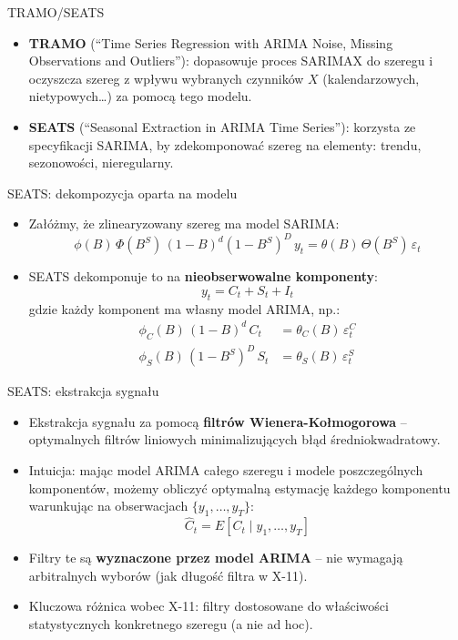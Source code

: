 \documentclass[11pt,usenames,dvipsnames,aspectratio=169]{beamer}
\begin{document}
\begin{frame}{TRAMO/SEATS}
\begin{itemize}
    \item \textbf{TRAMO} (``Time Series Regression with ARIMA Noise, Missing Observations and Outliers''): dopasowuje proces SARIMAX do szeregu i oczyszcza szereg z wpływu wybranych czynników $X$ (kalendarzowych, nietypowych\ldots) za pomocą tego modelu.
    \item \textbf{SEATS} (``Seasonal Extraction in ARIMA Time Series''): korzysta ze specyfikacji SARIMA, by zdekomponować szereg na elementy: trendu, sezonowości, nieregularny.
\end{itemize}
\end{frame}

\begin{frame}{SEATS: dekompozycja oparta na modelu}
\begin{itemize}
    \item Załóżmy, że zlinearyzowany szereg ma model SARIMA:
    \[
    \phi(B)\,\Phi(B^S)\,(1-B)^d(1-B^S)^D\,y_t = \theta(B)\,\Theta(B^S)\,\varepsilon_t
    \]
    \item SEATS dekomponuje to na \textbf{nieobserwowalne komponenty}:
    \[
    y_t = C_t + S_t + I_t
    \]
    gdzie każdy komponent ma własny model ARIMA, np.:
    \begin{align*}
    \phi_C(B)\,(1-B)^d\,C_t &= \theta_C(B)\,\varepsilon_t^C \\
    \phi_S(B)\,(1-B^S)^D\,S_t &= \theta_S(B)\,\varepsilon_t^S
    \end{align*}
\end{itemize}
\end{frame}

\begin{frame}{SEATS: ekstrakcja sygnału}
\begin{itemize}
    \item Ekstrakcja sygnału za pomocą \textbf{filtrów Wienera-Kołmogorowa} -- optymalnych filtrów liniowych minimalizujących błąd średniokwadratowy.
    \item Intuicja: mając model ARIMA całego szeregu i modele poszczególnych komponentów, możemy obliczyć optymalną estymację każdego komponentu warunkując na obserwacjach $\{y_1,\ldots,y_T\}$:
    \[
    \hat{C}_t = E\!\left[C_t \mid y_1, \ldots, y_T\right]
    \]
    \item Filtry te są \textbf{wyznaczone przez model ARIMA} -- nie wymagają arbitralnych wyborów (jak długość filtra w X-11).
    \item Kluczowa różnica wobec X-11: filtry dostosowane do właściwości statystycznych konkretnego szeregu (a nie ad hoc).
\end{itemize}
\end{frame}
\end{document}
